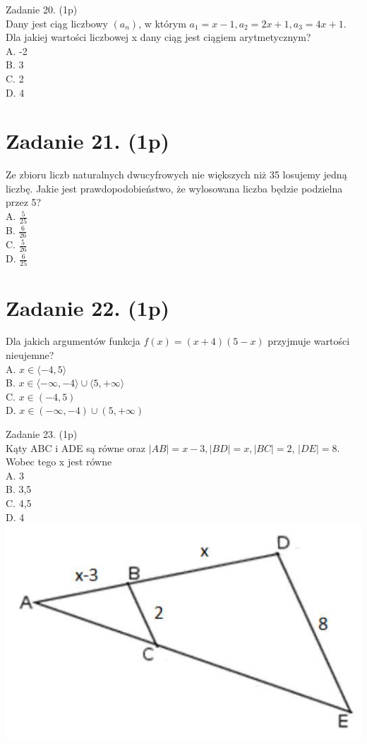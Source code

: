 \documentclass[10pt]{article}
\begin{document}
Zadanie 20. (1p)\\
Dany jest ciąg liczbowy \(\left(a_{n}\right)\), w którym \(a_{1}=x-1, a_{2}=2 x+1, a_{3}=4 x+1\). Dla jakiej wartości liczbowej x dany ciąg jest ciągiem arytmetycznym?\\
A. -2\\
B. 3\\
C. 2\\
D. 4

\section*{Zadanie 21. (1p)}
Ze zbioru liczb naturalnych dwucyfrowych nie większych niż 35 losujemy jedną liczbę. Jakie jest prawdopodobieństwo, że wylosowana liczba będzie podzielna przez 5?\\
A. \(\frac{5}{25}\)\\
B. \(\frac{6}{26}\)\\
C. \(\frac{5}{26}\)\\
D. \(\frac{6}{25}\)

\section*{Zadanie 22. (1p)}
Dla jakich argumentów funkcja \(f(x)=(x+4)(5-x)\) przyjmuje wartości nieujemne?\\
A. \(x \in\langle-4,5\rangle\)\\
B. \(x \in\langle-\infty,-4\rangle \cup\langle 5,+\infty\rangle\)\\
C. \(x \in(-4,5)\)\\
D. \(x \in(-\infty,-4) \cup(5,+\infty)\)

Zadanie 23. (1p)\\
Kąty ABC i ADE są równe oraz \(|A B|=x-3,|B D|=x,|B C|=2\), \(|D E|=8\). Wobec tego x jest równe\\
A. 3\\
B. 3,5\\
C. 4,5\\
D. 4\\
\includegraphics[max width=\textwidth, center]{2024_11_21_9d761ca624f0efee99a4g-06}
\end{document}
